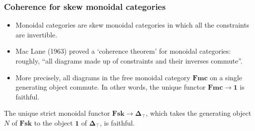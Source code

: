 \documentclass{beamer}
\newcommand{\lra}{\longrightarrow}
\begin{document}
 \begin{frame}
  \frametitle{Coherence for skew monoidal categories}
  \begin{itemize}
\item Monoidal categories are skew monoidal categories in which all the constraints are invertible. 
\pause
\item Mac Lane (1963) proved a `coherence theorem' for monoidal categories: roughly, 
``all diagrams made up of constraints and their inverses commute''.  
\pause
\item More precisely, all diagrams in the free monoidal category $\mathbf{Fmc}$ on a single generating object commute. In other words, the unique functor $\mathbf{Fmc} \lra \mathbf{1}$ is faithful. 
\end{itemize}
\pause
\begin{theorem}
The unique strict monoidal functor $\mathbf{Fsk} \lra \mathbf{\Delta}_{\top}$, which takes the 
generating object $N$ of $\mathbf{Fsk}$ to the object $\mathbf{1}$ of 
$\mathbf{\Delta}_{\top}$, is faithful.  
\end{theorem}
\end{frame}
\end{document}
